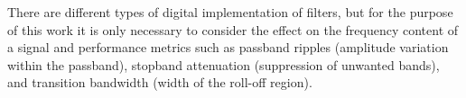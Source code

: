 There are different types of digital implementation of filters, but for the purpose of this work it is only necessary to consider the effect on the frequency content of a signal and performance metrics such as passband ripples (amplitude variation within the passband), stopband attenuation (suppression of unwanted bands), and transition bandwidth (width of the roll-off region).  



